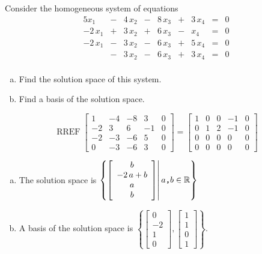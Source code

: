 
\begin{exerciseStatement}


Consider the homogeneous system of equations 
\begin{alignat*}{5} x_{1} &-& 4 \, x_{2} &-& 8 \, x_{3} &+& 3 \, x_{4} &=& 0 \\-2 \, x_{1} &+& 3 \, x_{2} &+& 6 \, x_{3} &-& x_{4} &=& 0 \\-2 \, x_{1} &-& 3 \, x_{2} &-& 6 \, x_{3} &+& 5 \, x_{4} &=& 0 \\ &-& 3 \, x_{2} &-& 6 \, x_{3} &+& 3 \, x_{4} &=& 0 \\ \end{alignat*}
            


\begin{enumerate}[(a)]
\item  Find the solution space of this system.
\item  Find a basis of the solution space.
\end{enumerate}
    
\end{exerciseStatement}
    
\begin{exerciseAnswer} 


\[\operatorname{RREF} \left[\begin{array}{cccc|c}
1 & -4 & -8 & 3 & 0 \\
-2 & 3 & 6 & -1 & 0 \\
-2 & -3 & -6 & 5 & 0 \\
0 & -3 & -6 & 3 & 0
\end{array}\right] = \left[\begin{array}{cccc|c}
1 & 0 & 0 & -1 & 0 \\
0 & 1 & 2 & -1 & 0 \\
0 & 0 & 0 & 0 & 0 \\
0 & 0 & 0 & 0 & 0
\end{array}\right] \]


\begin{enumerate}[(a)]
\item The solution space is \( \left\{ \left[\begin{array}{c}
b \\
-2 \, a + b \\
a \\
b
\end{array}\right] \middle|\,a\text{\texttt{,}}b\in\mathbb{R}\right\} \)
\item A basis of the solution space is \( \left\{ \left[\begin{array}{c}
0 \\
-2 \\
1 \\
0
\end{array}\right] , \left[\begin{array}{c}
1 \\
1 \\
0 \\
1
\end{array}\right] \right\} \).
\end{enumerate}
    
\end{exerciseAnswer}
    

